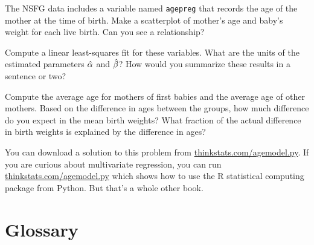 \documentclass[12pt]{book}
\begin{document}
\begin{ex}

The NSFG data includes a variable named {\tt agepreg} that records
the age of the mother at the time of birth.
Make a scatterplot of mother's age and baby's weight for each live
birth.  Can you see a relationship?

Compute a linear least-squares fit for these variables.  What are the
units of the estimated parameters $\hat{\alpha}$ and $\hat{\beta}$?
How would you summarize these results in a sentence or two?

Compute the average age for mothers of first babies and the average
age of other mothers.  Based on the difference in ages between the
groups, how much difference do you expect in the mean birth weights?
What fraction of the actual difference in birth weights is explained
by the difference in ages?

You can download a solution to this problem from
\url{thinkstats.com/agemodel.py}.  If you are curious about
multivariate regression, you can run \url{thinkstats.com/agemodel.py}
which shows how to use the R statistical computing package from
Python.  But that's a whole other book.

\end{ex}


\section{Glossary}
\end{document}
